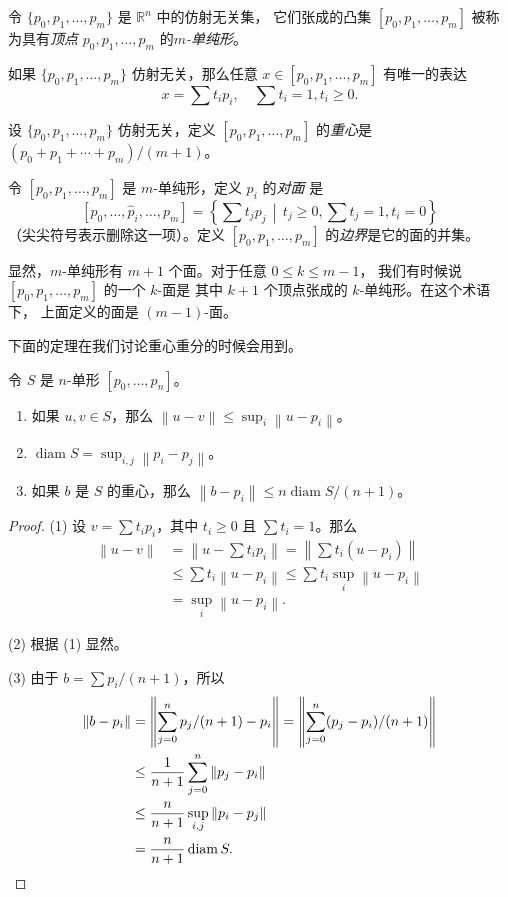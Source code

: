 \documentclass[fontset=none]{Notes}
\DeclareMathOperator\diam{diam}
\newcommand{\norm}[1]{\left\lVert#1\right\rVert}
\begin{document}
\begin{definition}
  令 $\{p_0,p_1,\dots,p_m\}$ 是 $\mathbb{R}^n$ 中的仿射无关集，
  它们张成的凸集 $[p_0,p_1,\dots,p_m]$ 被称为具有\emph{顶点}
  $p_0,p_1,\dots,p_m$ 的\emph{$m$-单纯形}。
\end{definition}

\begin{theorem}
  如果 $\{p_0,p_1,\dots,p_m\}$ 仿射无关，那么任意 $x\in [p_0,p_1,\dots,p_m]$
  有唯一的表达
  \[
    x=\sum t_ip_i,\quad \sum t_i=1, t_i\geq 0.
  \]
\end{theorem}

\begin{definition}
  设 $\{p_0,p_1,\dots,p_m\}$ 仿射无关，定义 $[p_0,p_1,\dots,p_m]$
  的\emph{重心}是 $(p_0+p_1+\cdots+p_m)/(m+1)$。
\end{definition}

\begin{definition}
  令 $[p_0,p_1,\dots,p_m]$ 是 $m$-单纯形，定义 $p_i$ 的\emph{对面}
  是
  \[
    [p_0,\dots,\hat p_i,\dots,p_m]=\left\{
      \sum t_jp_j\,\middle|\, t_j\geq 0,\sum t_j=1, t_i=0
    \right\}
  \]
  （尖尖符号表示删除这一项）。定义 $[p_0,p_1,\dots,p_m]$
  的\emph{边界}是它的面的并集。
\end{definition}

显然，$m$-单纯形有 $m+1$ 个面。对于任意 $0\leq k\leq m-1$，
我们有时候说 $[p_0,p_1,\dots,p_m]$ 的一个 $k$-面是
其中 $k+1$ 个顶点张成的 $k$-单纯形。在这个术语下，
上面定义的面是 $(m-1)$-面。

下面的定理在我们讨论重心重分的时候会用到。

\begin{theorem}
  令 $S$ 是 $n$-单形 $[p_0,\dots,p_n]$。
  \begin{enumerate}
    \item 如果 $u,v\in S$，那么 $\norm{u-v}\leq\sup_i\norm{u-p_i}$。
    \item $\diam S=\sup_{i,j}\norm{p_i-p_j}$。
    \item 如果 $b$ 是 $S$ 的重心，那么 $\norm{b-p_i}\leq n\diam S/(n+1)$。
  \end{enumerate}
\end{theorem}
\begin{proof}
  (1) 设 $v=\sum t_ip_i$，其中 $t_i\geq 0$ 且 $\sum t_i=1$。那么
  \begin{align*}
    \norm{u-v}&=\norm{u-\sum t_ip_i}=
    \norm{\sum t_i(u-p_i)}\\
    &\leq \sum t_i\norm{u-p_i}\leq \sum t_i\sup_i\norm{u-p_i}\\
    &=\sup_i\norm{u-p_i}.
  \end{align*}

  (2) 根据 (1) 显然。

  (3) 由于 $b=\sum p_i/(n+1)$，所以
  \begin{align*}
    \norm{b-p_i}&=\norm{\sum_{j=0}^n p_j/(n+1)-p_i}
    =\norm{\sum_{j=0}^n(p_j-p_i)/(n+1)}\\
    &\leq \frac{1}{n+1}\sum_{j=0}^n\norm{p_j-p_i}\\
    &\leq \frac{n}{n+1}\sup_{i,j}\norm{p_i-p_j}\\
    &=\frac{n}{n+1}\diam S.\qedhere
  \end{align*}
\end{proof}
\end{document}
